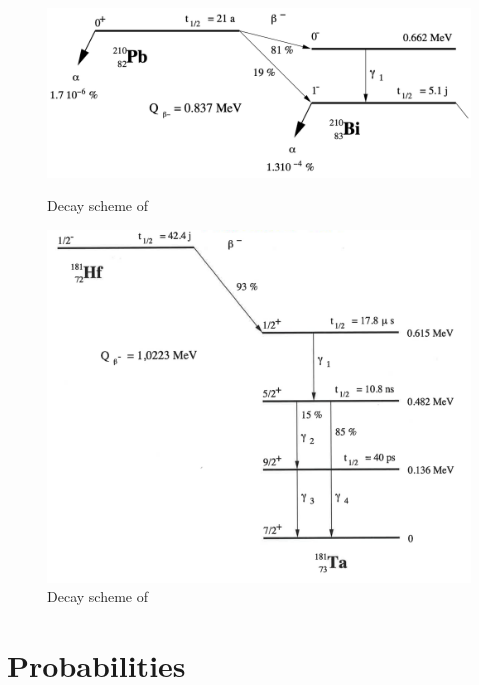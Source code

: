 \begin{figure}[htbp]
    \begin{minipage}[t]{0.5\textwidth}
        \centering
        \includegraphics[width=1\textwidth]{figures/decay_lead210.png}
        \caption{Decay scheme of \lead \cite{notice_VI}}
        \label{fig:lead_decay}
    \end{minipage}
    \begin{minipage}[t]{0.5\textwidth}
        \centering
        \includegraphics[width=\textwidth]{figures/decay_hafnium181.png}
        \caption{Decay scheme of \hafnium \cite{notice_VI}}
        \label{fig:hafnium_decay}
    \end{minipage}
\end{figure}

\section{Probabilities}
\label{sec:pearson}

